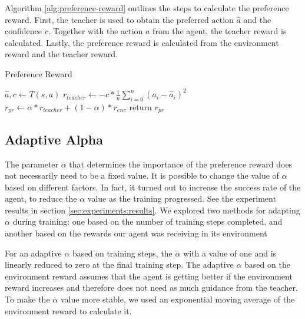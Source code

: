 Algorithm \ref{alg:preference-reward} outlines the steps to calculate the preference reward. First, the teacher is used to obtain the preferred action $\hat{a}$ and the confidence $c$. Together with the action $a$ from the agent, the teacher reward is calculated. Lastly, the preference reward is calculated from the environment reward and the teacher reward.
\begin{algorithm}[btp]
    \caption{Preference Reward}
    \label{alg:preference-reward}

    \DontPrintSemicolon
    

    
    \BlankLine
    $\hat{a}, c \leftarrow T(s, a)$\;
    $r_{teacher}\leftarrow -c * \frac{1}{n} \sum_{i=0}^n(a_i-\hat{a}_i)^2$\;
    $r_{pr}\leftarrow \alpha * r_{teacher} + (1-\alpha) * r_{env}$\;
    return $r_{pr}$\;
\end{algorithm}

\subsection{Adaptive Alpha}
\label{sec:adaptive-alpha}

The parameter $\alpha$ that determines the importance of the preference reward does not necessarily need to be a fixed value. It is possible to change the value of $\alpha$ based on different factors. In fact, it turned out to increase the success rate of the agent, to reduce the $\alpha$ value as the training progressed. See the experiment results in section \ref{sec:experiments:results}. We explored two methods for adapting $\alpha$ during training: one based on the number of training steps completed, and another based on the rewards our agent was receiving in its environment

For an adaptive $\alpha$ based on training steps, the $\alpha$ with a value of one and is linearly reduced to zero at the final training step. The adaptive $\alpha$ based on the environment reward assumes that the agent is getting better if the environment reward increases and therefore does not need as much guidance from the teacher. To make the $\alpha$ value more stable, we used an exponential moving average of the environment reward to calculate it.

